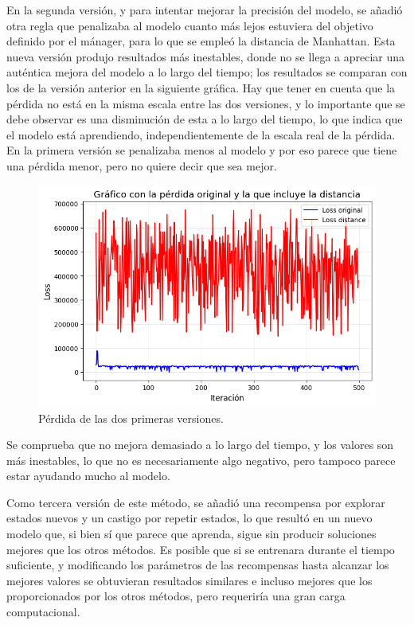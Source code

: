 \documentclass[letterpaper]{article} %
\begin{document}
En la segunda versión, y para intentar mejorar la precisión del modelo, se añadió otra regla que penalizaba al modelo cuanto más lejos estuviera del objetivo definido por el mánager, para lo que se empleó la distancia de Manhattan. Esta nueva versión 
produjo resultados más inestables, donde no se llega a apreciar una auténtica mejora del modelo a lo largo del tiempo; los resultados se comparan con los de la versión anterior en la siguiente gráfica. Hay que tener en cuenta que la pérdida no está
en la misma escala entre las dos versiones, y lo importante que se debe observar es una disminución de esta a lo largo del tiempo, lo que indica que el modelo está aprendiendo, independientemente de la escala real de la pérdida. En la primera versión se 
penalizaba menos al modelo y por eso parece que tiene una pérdida menor, pero no quiere decir que sea mejor.

\begin{figure}[H]
    \centering
    \includegraphics[width=0.9\columnwidth]{FuN_2.png}
    \caption{Pérdida de las dos primeras versiones.\label{fig:FuN4}}
\end{figure}

Se comprueba que no mejora demasiado a lo largo del tiempo, y los valores son más inestables, lo que no es necesariamente algo negativo, pero tampoco parece estar ayudando mucho al modelo.

Como tercera versión de este método, se añadió una recompensa por explorar estados nuevos y un castigo por repetir estados, lo que resultó en un nuevo modelo que, si bien sí que parece que aprenda, sigue sin producir soluciones mejores que los otros métodos. Es posible que si se entrenara durante el 
tiempo suficiente, y modificando los parámetros de las recompensas hasta alcanzar los mejores valores se obtuvieran resultados similares e incluso mejores que los proporcionados por los otros métodos, pero requeriría una gran carga computacional.
\end{document}

